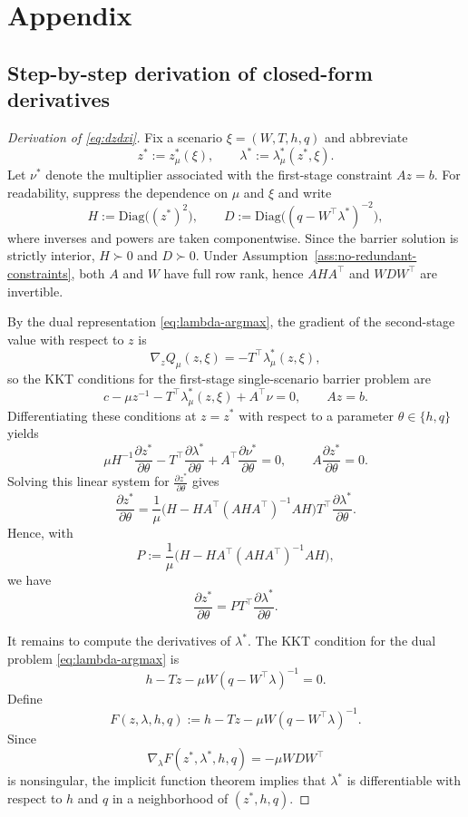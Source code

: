\documentclass{article}
\theoremstyle{plain}
\theoremstyle{definition}
\theoremstyle{remark}
\begin{document}
\appendix

\section{Appendix}
\label{sec:appendix}

\subsection{Step-by-step derivation of closed-form derivatives}
\label{sec:appendix-derivatives}
\begin{proof}[Derivation of \eqref{eq:dzdxi}]
Fix a scenario $\xi=(W,T,h,q)$ and abbreviate
\[
z^*:=z_\mu^*(\xi),\qquad
\lambda^*:=\lambda_\mu^*(z^*,\xi).
\]
Let $\nu^*$ denote the multiplier associated with the first-stage constraint $Az=b$.
For readability, suppress the dependence on $\mu$ and $\xi$ and write
\[
H:=\mathrm{Diag}\big((z^*)^2\big),\qquad
D:=\mathrm{Diag}\big((q-W^\top\lambda^*)^{-2}\big),
\]
where inverses and powers are taken componentwise. Since the barrier solution is strictly
interior, $H\succ 0$ and $D\succ 0$. Under Assumption~\ref{ass:no-redundant-constraints},
both $A$ and $W$ have full row rank, hence $AHA^\top$ and $WDW^\top$ are invertible.

By the dual representation \eqref{eq:lambda-argmax}, the gradient of the second-stage value
with respect to $z$ is
\[
\nabla_z Q_\mu(z,\xi)=-T^\top\lambda_\mu^*(z,\xi),
\]
so the KKT conditions for the first-stage single-scenario barrier problem are
\[
c-\mu z^{-1}-T^\top\lambda_\mu^*(z,\xi)+A^\top\nu=0,
\qquad
Az=b.
\]
Differentiating these conditions at $z=z^*$ with respect to a parameter
$\theta\in\{h,q\}$ yields
\[
\mu H^{-1}\frac{\partial z^*}{\partial \theta}
-
T^\top\frac{\partial \lambda^*}{\partial \theta}
+
A^\top\frac{\partial \nu^*}{\partial \theta}
=0,
\qquad
A\frac{\partial z^*}{\partial \theta}=0.
\]
Solving this linear system for $\frac{\partial z^*}{\partial \theta}$ gives
\[
\frac{\partial z^*}{\partial \theta}
=
\frac{1}{\mu}
\Big(
H-HA^\top(AHA^\top)^{-1}AH
\Big)
T^\top\frac{\partial \lambda^*}{\partial \theta}.
\]
Hence, with
\[
P:=\frac{1}{\mu}
\Big(
H-HA^\top(AHA^\top)^{-1}AH
\Big),
\]
we have
\[
\frac{\partial z^*}{\partial \theta}
=
PT^\top\frac{\partial \lambda^*}{\partial \theta}.
\]

It remains to compute the derivatives of $\lambda^*$. The KKT condition for the dual problem
\eqref{eq:lambda-argmax} is
\[
h-Tz-\mu W(q-W^\top\lambda)^{-1}=0.
\]
Define
\[
F(z,\lambda,h,q):=h-Tz-\mu W(q-W^\top\lambda)^{-1}.
\]
Since
\[
\nabla_\lambda F(z^*,\lambda^*,h,q)=-\mu WDW^\top
\]
is nonsingular, the implicit function theorem implies that $\lambda^*$ is differentiable with
respect to $h$ and $q$ in a neighborhood of $(z^*,h,q)$.


\end{proof}
\end{document}
